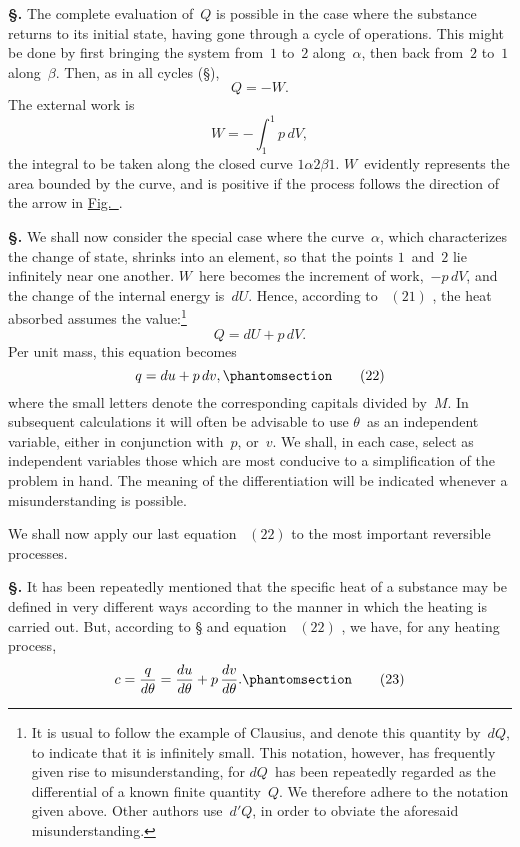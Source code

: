 \documentclass[12pt]{book}[2005/09/16]
\newcommand{\Section}[1]{
  \medskip\par\textbf{§\;#1}
  \label{section:#1}
}
\newcommand{\SecRef}[2][§\;]{\hyperref[section:#2.]{{\upshape #1#2}}}
\newcommand{\Tag}[1]{%
  \phantomsection\label{eqn:#1}\tag*{\ensuremath{#1}}%
}
\newcommand{\Eq}[1]{%
  \hyperref[eqn:#1]{\ensuremath{#1}}%
}
\newcommand{\Fig}[1]{\hyperref[fig:#1]{Fig.~{\upshape #1}}}
\newcommand{\PageSep}[1]{\ignorespaces}
\begin{document}
\Section{78.} The complete evaluation of~$Q$ is possible in the
case where the substance returns to its initial state, having
gone through a cycle of operations. This might be done by
first bringing the system from~$1$ to~$2$ along~$\alpha$, then back
from~$2$ to~$1$ along~$\beta$. Then, as in all cycles (\SecRef{65}),
\[
Q = -W.
\]
The external work is
\[
W = -\int_{1}^{1} p\, dV,
\]
the integral to be taken along the closed curve $1\alpha 2\beta 1$.
$W$~evidently represents the area bounded by the curve,
\PageSep{55}
and is positive if the process follows the direction of the
arrow in \Fig{2}.

\Section{79.} We shall now consider the special case where the
%
curve~$\alpha$, which characterizes the change of state, shrinks
into an element, so that the points $1$~and~$2$ lie infinitely
near one another. $W$~here becomes the increment of work,~$-p\, dV$,
and the change of the internal energy is~$dU$.
Hence, according to~\Eq{(21)}, the heat absorbed assumes the
value:\footnote
  {It is usual to follow the example of Clausius, and denote this quantity
  by~$dQ$, to indicate that it is infinitely small. This notation, however, has
  frequently given rise to misunderstanding, for $dQ$~has been repeatedly
  regarded as the differential of a known finite quantity~$Q$. We therefore
  adhere to the notation given above. Other authors use~$d'Q$, in order to
  obviate the aforesaid misunderstanding.}
\[
Q = dU + p\, dV.
\]
Per unit mass, this equation becomes
\[
q = du + p\, dv,
\Tag{(22)}
\]
where the small letters denote the corresponding capitals
divided by~$M$. In subsequent calculations it will often be
advisable to use $\theta$~as an independent variable, either in
conjunction with~$p$, or~$v$. We shall, in each case, select as
independent variables those which are most conducive to a
simplification of the problem in hand. The meaning of the
differentiation will be indicated whenever a misunderstanding
is possible.

We shall now apply our last equation~\Eq{(22)} to the most
important reversible processes.

\Section{80.} It has been repeatedly mentioned that the specific
heat of a substance may be defined in very different ways
according to the manner in which the heating is carried out.
But, according to \SecRef{46} and equation~\Eq{(22)}, we have, for any
heating process,
\[
c = \frac{q}{d\theta} = \frac{du}{d\theta} + p\, \frac{dv}{d\theta}.
\Tag{(23)}
\]
\PageSep{56}
\end{document}
